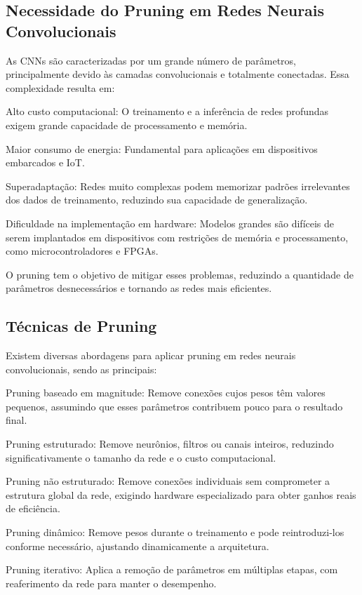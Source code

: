\subsection{Necessidade do Pruning em Redes Neurais Convolucionais}

As CNNs são caracterizadas por um grande número de parâmetros, principalmente devido às camadas convolucionais e totalmente conectadas. Essa complexidade resulta em:

Alto custo computacional: O treinamento e a inferência de redes profundas exigem grande capacidade de processamento e memória.

Maior consumo de energia: Fundamental para aplicações em dispositivos embarcados e IoT.

Superadaptação: Redes muito complexas podem memorizar padrões irrelevantes dos dados de treinamento, reduzindo sua capacidade de generalização.

Dificuldade na implementação em hardware: Modelos grandes são difíceis de serem implantados em dispositivos com restrições de memória e processamento, como microcontroladores e FPGAs.

O pruning tem o objetivo de mitigar esses problemas, reduzindo a quantidade de parâmetros desnecessários e tornando as redes mais eficientes.

\subsection{Técnicas de Pruning}

Existem diversas abordagens para aplicar pruning em redes neurais convolucionais, sendo as principais:

Pruning baseado em magnitude: Remove conexões cujos pesos têm valores pequenos, assumindo que esses parâmetros contribuem pouco para o resultado final.

Pruning estruturado: Remove neurônios, filtros ou canais inteiros, reduzindo significativamente o tamanho da rede e o custo computacional.

Pruning não estruturado: Remove conexões individuais sem comprometer a estrutura global da rede, exigindo hardware especializado para obter ganhos reais de eficiência.

Pruning dinâmico: Remove pesos durante o treinamento e pode reintroduzi-los conforme necessário, ajustando dinamicamente a arquitetura.

Pruning iterativo: Aplica a remoção de parâmetros em múltiplas etapas, com reaferimento da rede para manter o desempenho.

